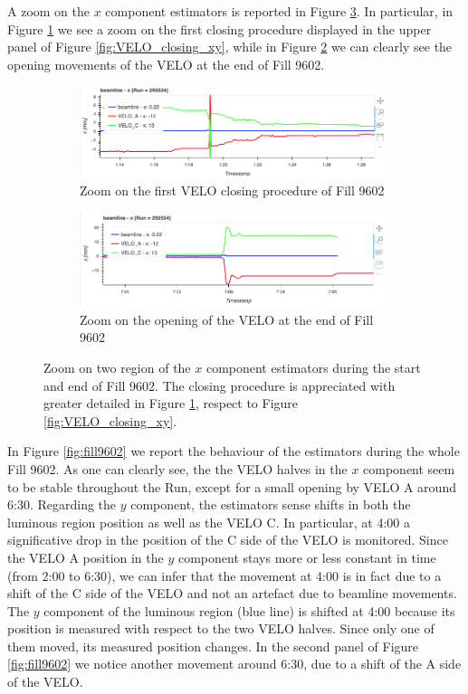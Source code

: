A zoom on the $x$ component estimators is reported in Figure \ref{zoom_velo}. In particular, in Figure \ref{fig:velo_closing_zoom} we see a zoom on the first closing procedure displayed in the upper panel of Figure \ref{fig:VELO_closing_xy}, while in Figure \ref{fig:velo_opens_zoom} we can clearly see the opening movements of the VELO at the end of Fill 9602.

\begin{figure}
    \centering
    \begin{subfigure}{0.8\textwidth}
    \includegraphics[width=\linewidth]{figures/Velo_closing_zoom.png}
    \caption{Zoom on the first VELO closing procedure of Fill 9602}
    \label{fig:velo_closing_zoom}
    \end{subfigure}\hfill
    \begin{subfigure}{0.8\textwidth}
    \includegraphics[width=\linewidth]{figures/VELO_opens_zoom.png}
    \caption{Zoom on the opening of the VELO at the end of Fill 9602}
    \label{fig:velo_opens_zoom}
    \end{subfigure}
    \caption{Zoom on two region of the $x$ component estimators during the start and end of Fill 9602. The closing procedure is appreciated with greater detailed in Figure \ref{fig:velo_closing_zoom}, respect to Figure \ref{fig:VELO_closing_xy}.}\label{zoom_velo}
\end{figure}
In Figure \ref{fig:fill9602} we report the behaviour of the estimators during the whole Fill 9602. As one can clearly see, the the VELO halves in the $x$ component seem to be stable throughout the Run, except for a small opening by VELO A around 6:30. Regarding the $y$ component, the estimators sense shifts in both the luminous region position as well as the VELO C. In particular, at 4:00 a significative drop in the position of the C side of the VELO is monitored. Since the VELO A position in the $y$ component stays more or less constant in time (from 2:00 to 6:30), we can infer that the movement at 4:00 is in fact due to a shift of the C side of the VELO and not an artefact due to beamline movements. The $y$ component of the luminous region (blue line) is shifted at 4:00 because its position is measured with respect to the two VELO halves. Since only one of them moved, its measured position changes. In the second panel of Figure \ref{fig:fill9602} we notice another movement around 6:30, due to a shift of the A side of the VELO.
